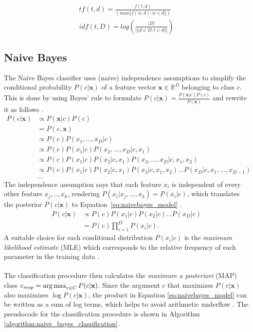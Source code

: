 \begin{equation}
\begin{array}{l}
tf(t,d) = \frac{f(t,d)}{(max \{f(w,d) : w \in d\})} \\
idf(t,D) = log(\frac{|D|}{|\{d \in D : t \in d\}|})
\end{array}
\label{eq:tfidf}
\end{equation}

\subsection{Naive Bayes}
The Naive Bayes classifier uses (naive) independence assumptions to simplify the conditional probability $P(c\vert\mathbf{x})$ of a feature vector $\mathbf{x} \in \mathbb{R}^D$ belonging to class $c$. This is done by using Bayes' rule to formulate $P(c\vert \mathbf{x}) = \frac{P(\mathbf{x}\vert c) P(c)}{P(\mathbf{x})}$ and rewrite it as follows \citep{nb_ai, devdatt_nb}. 
\begin{align*}
P(c\vert \mathbf{x}) &\propto P(\mathbf{x}\vert c)P(c)
\\&=P(c,\mathbf{x})
\\&\propto P(c) P(x_1,...,x_D\vert c)
\\&\propto P(c) P(x_1\vert c) P(x_2,...,x_D\vert c, x_1)
\\&\propto P(c) P(x_1\vert c) P(x_2\vert c, x_1) P(x_3,...,x_D\vert c,x_1,x_2)
\\&\propto P(c) P(x_1\vert c) P(x_2\vert c, x_1) P(x_3\vert c,x_1,x_2) \dots P(x_D\vert c, x_1,...,x_{D-1})
\\&\dots
\end{align*}
The independence assumption says that each feature $x_i$ is independent of every other feature $x_j,..,x_k$, rendering $P(x_i\vert x_j,...,x_k) = P(x_i\vert c)$, which translates the posterior $P(c\vert \mathbf{x})$ to Equation~\ref{eq:naivebayes_model} \citep{nb_ai, devdatt_nb}.
\begin{align}
P(c\vert \mathbf{x}) &\propto P(c) P(x_1\vert c) P(x_2\vert c) \dots P(x_D\vert c) \nonumber
\\&= P(c) \prod_{i=1}^{D} P(x_i\vert c).\label{eq:naivebayes_model}
\end{align}
A suitable choice for each conditional distribution $P(x_i\vert c)$ is the \textit{maximum likelihood estimate} (MLE) which corresponds to the relative frequency of each parameter in the training data \citep{devdatt_nb}.
\\\\
The classification procedure then calculates the \textit{maximum a posteriori} (MAP) class $c_{\textit{map}} = \operatorname*{arg\,max}_{c\in C} P(c\vert \mathbf{x})$. Since the argument $c$ that maximizes $P(c\vert \mathbf{x})$ also maximizes $\log P(c\vert \mathbf{x})$, the product in Equation \ref{eq:naivebayes_model} can be written as a sum of log terms, which helps to avoid arithmetic underflow \citep{devdatt_nb}. The pseudocode for the classification procedure is shown in Algorithm \ref{algorithm:naive_bayes_classification}. \\ \\ \\ \\ \\
